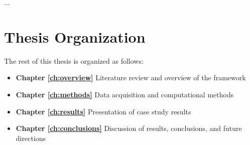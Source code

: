 ...

\section{Thesis Organization}\label{sec:organization}

The rest of this thesis is organized as follows:

\begin{itemize}


\item \textbf{Chapter \ref{ch:overview}} Literature review and overview of the framework

\item \textbf{Chapter \ref{ch:methods}} Data acquisition and computational methods

\item \textbf{Chapter \ref{ch:results}} Presentation of case study results

\item \textbf{Chapter \ref{ch:conclusions}} Discussion of results, conclusions, and future directions

\end{itemize}

